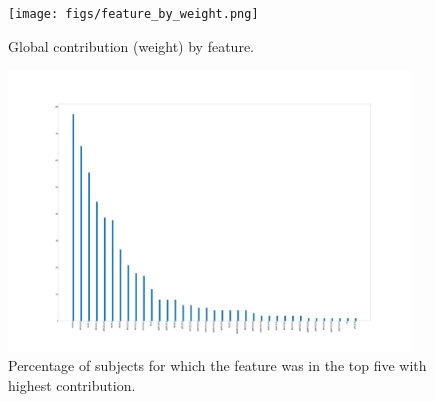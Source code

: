 	\begin{figure}[t]
		\begin{center}
			\texttt{[image: figs/feature\_by\_weight.png]}
		\end{center}
		\caption{Global contribution (weight) by feature.}
		\label{weight}
	\end{figure}


	\begin{figure}[t]
		\begin{center}
			\includegraphics[clip=false,height=0.95\textwidth,width=0.95\textwidth]{figs/feature_by_percentage.png}
		\end{center}
		\caption{Percentage of subjects for which the feature was in the top five with highest contribution.}
		\label{percentage}
	\end{figure}

